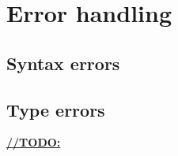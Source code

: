 \section{Error handling}
\subsection{Syntax errors}
\subsection{Type errors}

\underline{\textbf{\LARGE //TODO:}}